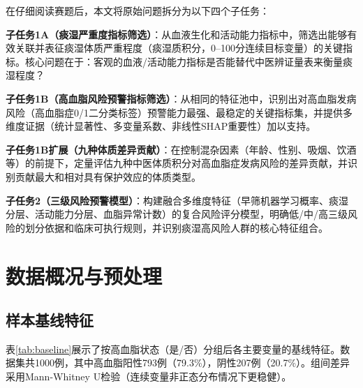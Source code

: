 \documentclass[12pt,a4paper]{ctexart}
\begin{document}
在仔细阅读赛题后，本文将原始问题拆分为以下四个子任务：

\textbf{子任务1A（痰湿严重度指标筛选）}：从血液生化和活动能力指标中，筛选出能够有效关联并表征痰湿体质严重程度（痰湿质积分，0--100分连续目标变量）的关键指标。核心问题在于：客观的血液/活动能力指标是否能替代中医辨证量表来衡量痰湿程度？

\textbf{子任务1B（高血脂风险预警指标筛选）}：从相同的特征池中，识别出对高血脂发病风险（高血脂症0/1二分类标签）预警能力最强、最稳定的关键指标集，并提供多维度证据（统计显著性、多变量系数、非线性SHAP重要性）加以支持。

\textbf{子任务1B扩展（九种体质差异贡献）}：在控制混杂因素（年龄、性别、吸烟、饮酒等）的前提下，定量评估九种中医体质积分对高血脂症发病风险的差异贡献，并识别贡献最大和相对具有保护效应的体质类型。

\textbf{子任务2（三级风险预警模型）}：构建融合多维度特征（早筛机器学习概率、痰湿分层、活动能力分层、血脂异常计数）的复合风险评分模型，明确低/中/高三级风险的划分依据和临床可执行规则，并识别痰湿高风险人群的核心特征组合。

\section{数据概况与预处理}

\subsection{样本基线特征}

表\ref{tab:baseline}展示了按高血脂状态（是/否）分组后各主要变量的基线特征。数据集共1000例，其中高血脂阳性793例（79.3\%），阴性207例（20.7\%）。组间差异采用Mann-Whitney U检验（连续变量非正态分布情况下更稳健）。
\end{document}
